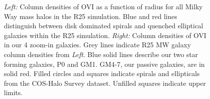 \documentclass[]{emulateapj}
\begin{document}
\begin{figure}[ht!]
\centerline{
}
\caption[]{\textit{Left:} Column densities of OVI as a function of radius for all Milky Way mass halos in the R25 simulation. Blue and red lines distinguish between disk dominated spirals and quenched elliptical galaxies within the R25 simulation. \textit{Right:} Column densities of OVI in our 4 zoom-in galaxies. Grey lines indicate R25 MW galaxy column densities from \textit{Left}. Blue solid lines describe our two star forming galaxies, P0 and GM1. GM4-7, our passive galaxies, are in solid red. Filled circles and squares indicate spirals and ellipticals from the COS-Halo Survey dataset. Unfilled squares indicate upper limits.}
\label{figure:ROM_Novi_vs_b}
\end{figure}
\end{document}
